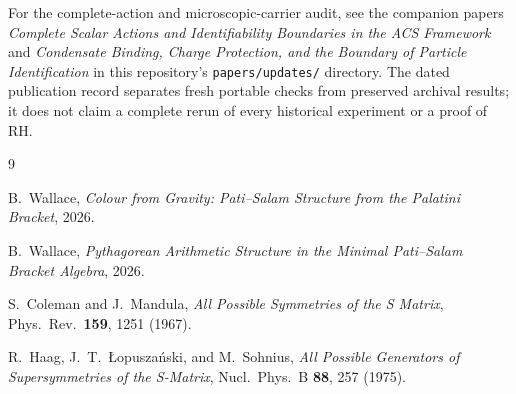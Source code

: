 \documentclass[11pt]{article}
\theoremstyle{plain}
\theoremstyle{definition}
\theoremstyle{remark}
\begin{document}
For the complete-action and microscopic-carrier audit, see the companion
papers \emph{Complete Scalar Actions and Identifiability Boundaries in the ACS
Framework} and \emph{Condensate Binding, Charge Protection, and the Boundary
of Particle Identification} in this repository's \texttt{papers/updates/}
directory. The dated publication record separates fresh portable checks
from preserved archival results; it does not claim a complete rerun of every
historical experiment or a proof of RH.

\begin{thebibliography}{9}

B.~Wallace,
\textit{Colour from Gravity: Pati--Salam Structure from the Palatini
Bracket},
2026.

B.~Wallace,
\textit{Pythagorean Arithmetic Structure in the Minimal Pati--Salam
Bracket Algebra},
2026.

S.~Coleman and J.~Mandula,
\textit{All Possible Symmetries of the S Matrix},
Phys.\ Rev.\ \textbf{159}, 1251 (1967).

R.~Haag, J.~T.~{\L}opusza\'{n}ski, and M.~Sohnius,
\textit{All Possible Generators of Supersymmetries of the S-Matrix},
Nucl.\ Phys.\ B \textbf{88}, 257 (1975).

\end{thebibliography}
\end{document}
